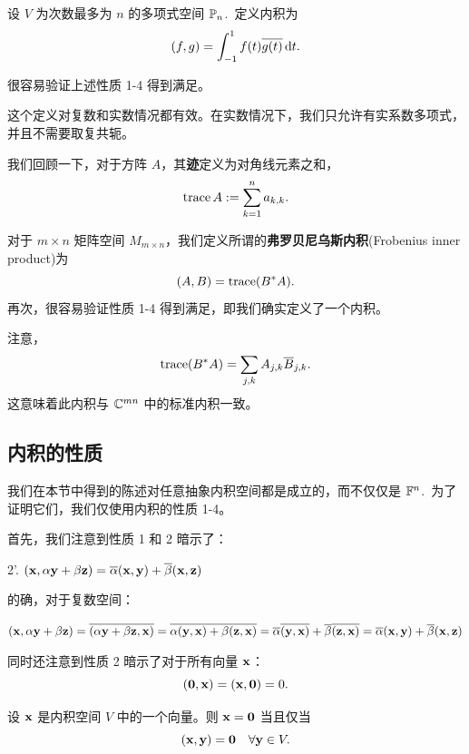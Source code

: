 \begin{example}\label{stmt:05-01-02}
设 $V$ 为次数最多为 $n$ 的多项式空间 $\mathbb{P}_n$.~定义内积为
$$(f, g) = \int_{-1}^1 f(t) \overline{g(t)}\mathop{}\!\mathrm{d} t.$$
\end{example}

很容易验证上述性质 1-4 得到满足。

这个定义对复数和实数情况都有效。在实数情况下，我们只允许有实系数多项式，并且不需要取复共轭。

我们回顾一下，对于方阵 $A$，其\textbf{迹}定义为对角线元素之和，$$\operatorname{trace} A := \sum_{k=1}^n a_{k,k}.$$

\begin{example}\label{stmt:05-01-03}
对于 $m \times n$ 矩阵空间 $M_{m \times n}$，我们定义所谓的\textbf{弗罗贝尼乌斯内积}(Frobenius inner product)为
$$(A, B) = \operatorname{trace}(B^* A).$$
再次，很容易验证性质 1-4 得到满足，即我们确实定义了一个内积。
\end{example}

注意，$$\operatorname{trace}(B^* A) = \sum_{j,k} A_{j,k}\overline{B}_{j,k} .$$
这意味着此内积与 $\mathbb{C}^{mn}$ 中的标准内积一致。

\subsection{内积的性质}\label{sec:05-01-04}

我们在本节中得到的陈述对任意抽象内积空间都是成立的，而不仅仅是 $\mathbb{F}^n$.~为了证明它们，我们仅使用内积的性质 1-4。

首先，我们注意到性质 1 和 2 暗示了：

2'. $(\mathbf{x}, \alpha \mathbf{y} + \beta \mathbf{z}) = \overline{\alpha} (\mathbf{x}, \mathbf{y}) + \overline{\beta} (\mathbf{x}, \mathbf{z})$


的确，对于复数空间：

$(\mathbf{x}, \alpha \mathbf{y} + \beta \mathbf{z}) = \overline{(\alpha \mathbf{y} + \beta \mathbf{z}, \mathbf{x})} = \overline{\alpha (\mathbf{y}, \mathbf{x}) + \beta (\mathbf{z}, \mathbf{x})} = \overline{\alpha} \overline{(\mathbf{y}, \mathbf{x})} + \overline{\beta} \overline{(\mathbf{z}, \mathbf{x})} = \overline{\alpha} (\mathbf{x}, \mathbf{y}) + \overline{\beta} (\mathbf{x}, \mathbf{z})$

同时还注意到性质 2 暗示了对于所有向量 $\mathbf{x}$：$$(\mathbf{0}, \mathbf{x}) = (\mathbf{x}, \mathbf{0}) = 0.$$

\begin{lemma}\label{stmt:05-01-04}  设 $\mathbf{x}$ 是内积空间 $V$ 中的一个向量。则 $\mathbf{x} = \mathbf{0}$ 当且仅当
  \begin{equation}\label{eq:05-01-01}
(\mathbf{x}, \mathbf{y}) = \mathbf{0} \quad \forall \mathbf{y} \in V.
\end{equation}\end{lemma}


